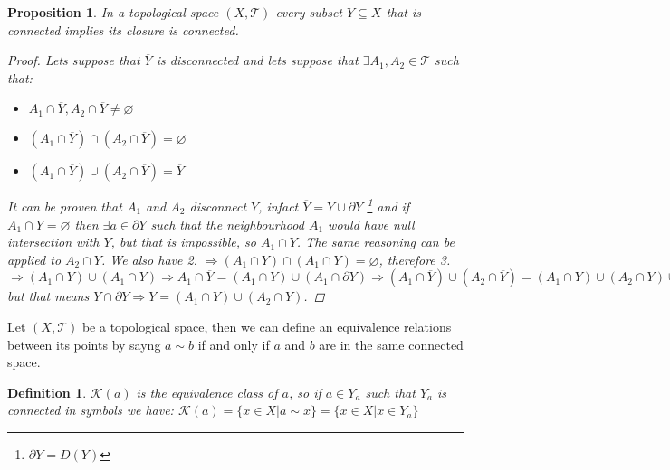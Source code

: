 \documentclass{article}
\newtheorem{proposition}{Proposition}
\newtheorem{definition}{Definition}
\begin{document}
            \begin{proposition}
                In a topological space $(X, \mathcal{T})$ every subset $Y \subseteq X$ that is connected implies its closure is connected.
                \begin{proof}
                    Lets suppose that $\overline{Y}$ is disconnected and lets suppose that $\exists A_1,A_2 \in \mathcal{T}$ such that:
                    \begin{itemize}
                        \item[1.] $A_1 \cap \overline{Y}, A_2 \cap \overline{Y} \neq \varnothing$
                        \item[2.] $\left( A_1 \cap \overline{Y} \right) \cap \left( A_2 \cap \overline{Y} \right) = \varnothing$
                        \item[3.] $\left( A_1 \cap \overline{Y} \right) \cup \left( A_2 \cap \overline{Y} \right) = \overline{Y}$   
                    \end{itemize}
                    It can be proven that $A_1$ and $A_2$ disconnect $Y$, infact $\overline{Y} = Y \cup \partial Y$ \footnote{$\partial Y = D(Y)$} and if $A_1 \cap Y = \varnothing$ then $\exists a \in \partial Y$ such that the neighbourhood $A_1$ would have null intersection with $Y$, but that is impossible,
                    so $A_1 \cap Y$. The same reasoning can be applied to $A_2 \cap Y$. We also have 2. $\Rightarrow \left( A_1 \cap Y \right) \cap \left( A_1 \cap Y \right) = \varnothing$, therefore 3. $\Rightarrow \left( A_1 \cap Y \right) \cup \left( A_1 \cap Y \right) \Rightarrow A_1 \cap \overline{Y} = \left( A_1 \cap Y \right) \cup \left( A_1 \cap \partial Y \right) \Rightarrow \left( A_1 \cap \overline{Y} \right) \cup \left( A_2 \cap \overline{Y} \right) = \left( A_1 \cap Y \right) \cup \left( A_2 \cap Y \right) \cup \left( \left( A_1 \cup A_2 \right) \cap \partial Y \right)$ but that means $Y \cap \partial Y \Rightarrow Y = \left( A_1 \cap Y \right) \cup \left( A_2 \cap Y \right)$.
                \end{proof}
            \end{proposition}        
                Let $(X,\mathcal{T})$ be a topological space, then we can define an equivalence relations between its points by sayng $a \sim b$ if and only if $a$ and $b$ are in the same connected space.  
            \begin{definition}
                $\mathcal{K}(a)$ is the equivalence class of $a$, so if $a \in Y_a$ such that $Y_a$ is connected in symbols we have: $\mathcal{K}(a) = \{ x \in X | a \sim x \} = \{ x \in X| x \in Y_a\}$
            \end{definition}
\end{document}
